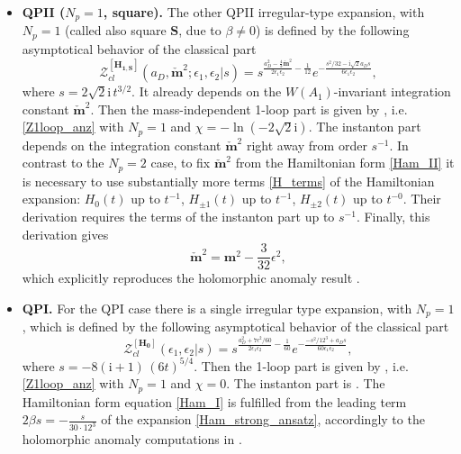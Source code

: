 \documentclass[12pt,a4paper]{article}
\numberwithin{equation}{section}
\newcommand{\ri}{\mathrm{i}}
\newcommand{\D}{\scriptscriptstyle{D}}
\begin{document}
\begin{itemize}
    \item {\bf QPII ($N_p=1$, square).}
    The other QPII irregular-type expansion, with $N_p=1$ (called also square $\mathbf{S}$, due to $\beta\neq0$) is defined by the following asymptotical behavior of the classical part \cite[(4.123)]{BST25}
    \begin{equation}
    \mathcal{Z}_{cl}^{[\mathbf{H_{1,S}}]}(a_{\D},\check{\boldsymbol{m}}^2;\epsilon_1,\epsilon_2|s)= s^{\frac{a_{\D}^2-\frac43\check{\boldsymbol{m}}^2}{2\epsilon_1\epsilon_2}-\frac1{12}}e^{-\frac{s^2/32-\ri \sqrt2 a_{\D} s}{6\epsilon_1\epsilon_2}}, 
    \end{equation}
    where $s=2\sqrt2\ri\,t^{3/2}$. It already depends on the $W(A_1)$-invariant integration constant $\check{\boldsymbol{m}}^2$.
    Then the mass-independent 1-loop part is given by \cite[(4.129)]{BST25}, i.e. \eqref{Z1loop_anz} with $N_p=1$ and $\chi=-\ln(-2\sqrt2 \ri)$. The instanton part \cite[(4.125)]{BST25} depends on the integration constant $\check{\boldsymbol{m}}^2$ right away from order $s^{-1}$. In contrast to the $N_p=2$ case, to fix $\check{\boldsymbol{m}}^2$ from the Hamiltonian form \eqref{Ham_II} it is necessary to use substantially more terms \eqref{H_terms} of the Hamiltonian expansion: $H_0(t)$ up to $t^{-1}$, $H_{\pm1}(t)$ up to $t^{-1}$, $H_{\pm2}(t)$ up to $t^{-0}$. Their derivation requires the terms of the instanton part up to $s^{-1}$. 
    Finally, this derivation gives
     \begin{equation}
     \check{\boldsymbol{m}}^2=\boldsymbol{m}^2-\frac3{32}\epsilon^2,   
\end{equation} 
which explicitly reproduces the holomorphic anomaly result \cite[(5.76)]{BST25}.
   
    \item {\bf QPI.}
    For the QPI case there is a single irregular type expansion, with $N_p=1$, which is defined by the following asymptotical behavior of the classical part \cite[(4.133)]{BST25}
    \begin{equation}
    \mathcal{Z}_{cl}^{[\mathbf{H_0}]}(\epsilon_1,\epsilon_2|s)= s^{\frac{a_{\D}^2+7\epsilon^2/60}{2\epsilon_1\epsilon_2}-\frac1{60}}e^{-\frac{-s^2/12^3+a_{\D} s}{60\epsilon_1\epsilon_2}},   
    \end{equation}
    where $s=-8(\ri{+}1)\, (6t)^{5/4}$. Then the 1-loop part is given by \cite[(4.136)]{BST25}, i.e. \eqref{Z1loop_anz} with $N_p=1$ and $\chi=0$.
The instanton part is \cite[(4.135)]{BST25}. The Hamiltonian form equation \eqref{Ham_I} is fulfilled from the leading term $2\beta s=-\frac{s}{30\cdot 12^3}$ of the expansion \eqref{Ham_strong_ansatz}, accordingly to the holomorphic anomaly computations in \cite[Sec. 5.7]{BST25}.
\end{itemize}
\end{document}
